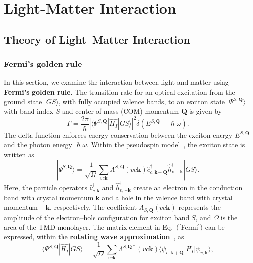 \chapter{Light-Matter Interaction}
\label{ch:method}

\section{Theory of Light--Matter Interaction}
\subsection{Fermi's golden rule}

In this section, we examine the interaction between light and matter using \textbf{Fermi's golden rule}. The transition rate for an optical excitation from the ground state $|GS\rangle$, with fully occupied valence bands, to an exciton state $|\Psi^{S, \boldsymbol{Q}}\rangle$ with band index $S$ and center-of-mass (COM) momentum $\boldsymbol{Q}$ is given by
\begin{equation}
\Gamma=\frac{2\pi}{\hslash}
\left|
\langle\Psi^{S, \boldsymbol{Q}}|\hat{H_I}|GS\rangle
\right|^2
\delta(E^{S, \boldsymbol{Q}}-\hslash\omega).
\label{Fermi}
\end{equation}
The delta function enforces energy conservation between the exciton energy $E^{S, \boldsymbol{Q}}$ and the photon energy $\hslash\omega$. Within the pseudospin model~\cite{simbulan2021selective, peng2022tailoring, sanchez2024enhanced}, the exciton state is written as
\begin{equation}
|\Psi^{S, \boldsymbol{Q}}\rangle
=
\frac{1}{\sqrt{\Omega}} 
\sum_{vc\boldsymbol{k}} 
\Lambda^{S,\boldsymbol{Q}}(vc\boldsymbol{k})
\hat{c}^\dagger_{c,\boldsymbol{k}+\boldsymbol{Q}} 
\hat{h}^\dagger_{v,-\boldsymbol{k}} 
|GS\rangle.
\label{EXstate}
\end{equation}
Here, the particle operators $\hat{c}_{c,\boldsymbol{k}}^\dagger$ and $\hat{h}_{v,-\boldsymbol{k}}^\dagger$ create an electron in the conduction band with crystal momentum $\boldsymbol{k}$ and a hole in the valence band with crystal momentum $-\boldsymbol{k}$, respectively. The coefficient $\Lambda_{S,\boldsymbol{Q}}(vc\boldsymbol{k})$ represents the amplitude of the electron--hole configuration for exciton band $S$, and $\Omega$ is the area of the TMD monolayer.
The matrix element in Eq.~(\ref{Fermi}) can be expressed, within the \textbf{rotating wave approximation}~\cite{griffiths2018introduction}, as
\begin{equation}
\langle\Psi^{S, \boldsymbol{Q}}|\hat{H_I}|GS\rangle 
=
\frac{1}{\sqrt{\Omega}} 
\sum_{vc\boldsymbol{k}} 
\Lambda^{S,\boldsymbol{Q} *}(vc\boldsymbol{k}) 
\langle\psi_{c, \boldsymbol{k}+\boldsymbol{Q}}|H_I|\psi_{v, \boldsymbol{k}}\rangle,
\label{eq:matrix_element}
\end{equation}
